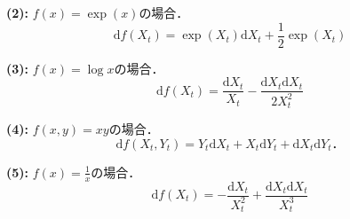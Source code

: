 \documentclass{jsarticle}
\theoremstyle{definition}
\begin{document}
\noindent
\textbf{(2):} $f(x) = \exp{(x)}$の場合．
$$
    \mathrm{d}f(X_t) = \exp{(X_t)}\mathrm{d}X_t + \frac{1}{2}\exp{(X_t)}
$$

\noindent
\textbf{(3):} $f(x) = \log{x}$の場合．
$$
    \mathrm{d}f(X_t) = \frac{\mathrm{d}X_t}{X_t} - \frac{\mathrm{d}X_t\mathrm{d}X_t}{2X_t^2}
$$

\noindent
\textbf{(4):} $f(x, y) = xy$の場合．
$$
    \mathrm{d}f(X_t, Y_t) = Y_t\mathrm{d}X_t + X_t\mathrm{d}Y_t + \mathrm{d}X_t\mathrm{d}Y_t．
$$

\noindent
\textbf{(5):} $f(x) = \frac{1}{x}$の場合．
$$
    \mathrm{d}f(X_t) = -\frac{\mathrm{d}X_t}{X_t^2} + \frac{\mathrm{d}X_t\mathrm{d}X_t}{X_t^3}
$$
\end{document}
